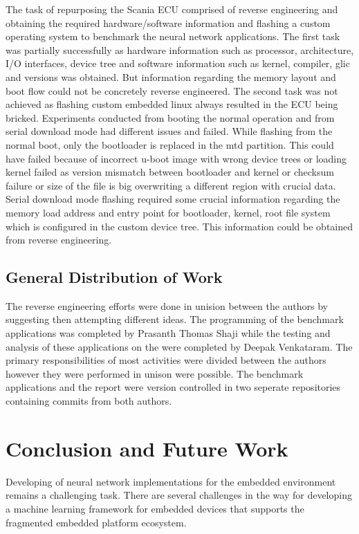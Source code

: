 The task of repurposing the Scania ECU comprised of reverse engineering and obtaining the required hardware/software information and flashing a custom operating system to benchmark the neural network applications. The first task was partially successfully as hardware information such as processor, architecture, I/O interfaces, device tree and software information such as kernel, compiler, glic and versions was obtained. But information regarding the memory layout and boot flow could not be concretely reverse engineered. The second task was not achieved as flashing custom embedded linux always resulted in the ECU being bricked. Experiments conducted from booting the normal operation and from serial download mode had different issues and failed. While flashing from the normal boot, only the bootloader is replaced in the mtd partition. This could have failed because of incorrect u-boot image with wrong device trees or loading kernel failed as version mismatch between bootloader and kernel or checksum failure or size of the file is big overwriting a different region with crucial data. Serial download mode flashing required some crucial information regarding the memory load address and entry point for bootloader, kernel, root file system which is configured in the custom device tree. This information could be obtained from reverse engineering.

\section{General Distribution of Work}

The reverse engineering efforts were done in unision between the authors by suggesting then attempting different ideas. The programming of the benchmark applications was completed by Prasanth Thomas Shaji while the testing and analysis of these applications on the were completed by Deepak Venkataram. The primary responsibilities of most activities were divided between the authors however they were performed in unison were possible. The benchmark applications and the report were version controlled in two seperate repositories containing commits from both authors.

\chapter{Conclusion and Future Work}

Developing of neural network implementations for the embedded environment remains a challenging task. There are several challenges in the way for developing a machine learning framework for embedded devices that supports the fragmented embedded platform ecosystem.

